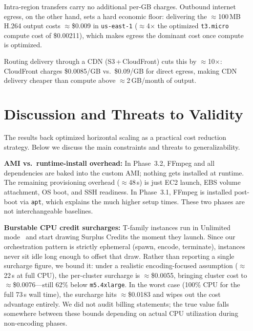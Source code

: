\documentclass[conference]{IEEEtran}
\begin{document}
Intra-region transfers carry no additional per-GB charges. Outbound internet egress, on the other hand, sets a hard economic floor: delivering the $\approx$100\,MB H.264 output costs $\approx$\$0.009 in \texttt{us-east-1} ($\approx$4$\times$ the optimized \texttt{t3.micro} compute cost of \$0.00211), which makes egress the dominant cost once compute is optimized.

Routing delivery through a CDN (S3\,+\,CloudFront) cuts this by $\approx$10$\times$: CloudFront charges \$0.0085/GB vs.\ \$0.09/GB for direct egress, making CDN delivery cheaper than compute above $\approx$2\,GB/month of output.

\section{Discussion and Threats to Validity}
\label{limitations}

The results back optimized horizontal scaling as a practical cost reduction strategy. Below we discuss the main constraints and threats to generalizability.

\textbf{AMI vs.\ runtime-install overhead:} In Phase~3.2, FFmpeg and all dependencies are baked into the custom AMI; nothing gets installed at runtime. The remaining provisioning overhead ($\approx$48\,s) is just EC2 launch, EBS volume attachment, OS boot, and SSH readiness. In Phase~3.1, FFmpeg is installed post-boot via \texttt{apt}, which explains the much higher setup times. These two phases are not interchangeable baselines.

\textbf{Burstable CPU credit surcharges:} T-family instances run in Unlimited mode~\cite{awscredits} and start drawing Surplus Credits the moment they launch. Since our orchestration pattern is strictly ephemeral (spawn, encode, terminate), instances never sit idle long enough to offset that draw. Rather than reporting a single surcharge figure, we bound it: under a realistic encoding-focused assumption ($\approx$22\,s at full CPU), the per-cluster surcharge is $\approx$\$0.0055, bringing cluster cost to $\approx$\$0.0076---still 62\% below \texttt{m5.4xlarge}. In the worst case (100\% CPU for the full 73\,s wall time), the surcharge hits $\approx$\$0.0183 and wipes out the cost advantage entirely. We did not audit billing statements; the true value falls somewhere between these bounds depending on actual CPU utilization during non-encoding phases.
\end{document}
